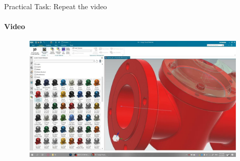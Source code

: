 \documentclass[aspectratio=169]{beamer}
\newcommand{\fbckg}[1]{\usebackgroundtemplate{\texttt{[image: \#1]}}}%
\begin{document}
\begin{frame}[t]{Practical Task: Repeat the video}
    \framesubtitle{Video}
    \vspace{-0.6cm}
    \begin{figure}[H]
        \href{https://disk.yandex.ru/i/aXWXryrDGGdZ0A}{
            \centering\includegraphics[height=6cm,width=1\textwidth,keepaspectratio]{practice_render.jpg}}
        \label{fig:practice_render.jpg}
    \end{figure}
\end{frame}

    

\fbckg{fibeamer/figs/last_page.png}
\frame[plain]{}
\end{document}
